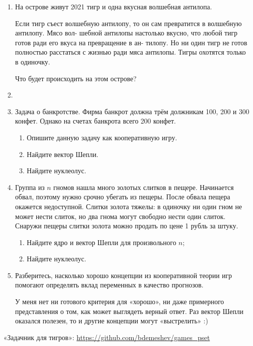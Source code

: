 \documentclass[12pt]{article} %
\theoremstyle{definition} %
\begin{document}
\begin{enumerate}
\item На острове живут 2021 тигр и одна вкусная волшебная антилопа.

Если тигр съест волшебную антилопу, то он сам превратится в волшебную антилопу. 
Мясо вол-
шебной антилопы настолько вкусно, что любой тигр готов ради его вкуса на превращение в ан-
тилопу. Но ни один тигр не готов полностью расстаться с жизнью ради мяса антилопы. 
Тигры
охотятся только в одиночку.

Что будет происходить на этом острове?

\item 

\item Задача о банкротстве. Фирма банкрот должна трём должникам 100, 200 и 300 конфет. 
Однако на счетах банкрота всего 200 конфет. 

\begin{enumerate}
  \item Опишите данную задачу как кооперативную игру. 
  \item Найдите вектор Шепли.
  \item Найдите нуклеолус. 
\end{enumerate}

\item Группа из $n$ гномов нашла много золотых слитков в пещере. Начинается обвал, поэтому нужно
срочно убегать из пещеры. После обвала пещера окажется недоступной. Слитки золота тяжелы: в
одиночку ни один гном не может нести слиток, но два гнома могут свободно нести один слиток.
Снаружи пещеры слитки золота можно продать по цене 1 рубль за штуку.

\begin{enumerate}
  \item Найдите ядро и вектор Шепли для произвольного $n$;
  \item Найдите нуклеолус.
\end{enumerate}

\item Разберитесь, насколько хорошо концепции из кооперативной теории игр 
помогают определять вклад переменных в качество прогнозов. 

У меня нет ни готового критерия для «хорошо», ни даже примерного представления о том, 
как может выглядеть верный ответ. Раз вектор Шепли оказался полезен, то и другие 
концепции могут «выстрелить» :)


\end{enumerate}


«Задачник для тигров»: \url{https://github.com/bdemeshev/games_pset}
\end{document}
